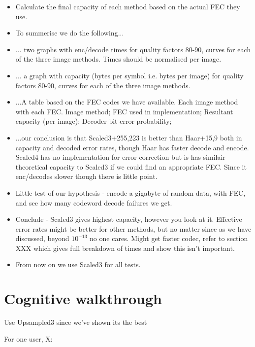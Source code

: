 \begin{itemize}
\item Calculate the final capacity of each method based on the actual FEC they use.

\item To summerise we do the following...

\item ... two graphs with enc/decode times for quality factors 80-90, curves for each of the three image methods. Times should be normalised per image.

\item ... a graph with capacity (bytes per symbol i.e. bytes per image) for quality factors 80-90, curves for each of the three image methods.

\item ...A table based on the FEC codes we have available. Each image method with each FEC. Image method; FEC used in implementation; Resultant capacity (per image); Decoder bit error probability; 

\item ...our conclusion is that Scaled3+255,223 is better than Haar+15,9 both in capacity and decoded error rates, though Haar has faster decode and encode. Scaled4 has no implementation for error correction but is has similair theoretical capacity to Scaled3 if we could find an appropriate FEC. Since it enc/decodes slower though there is little point.

\item Little test of our hypothesis - encode a gigabyte of random data, with FEC, and see how many codeword decode failures we get.

\item Conclude - Scaled3 gives highest capacity, however you look at it. Effective error rates might be better for other methods, but no matter since as we have discussed, beyond $10^{-13}$ no one cares. Might get faster codec, refer to section XXX which gives full breakdown of times and show this isn't important.

\item From now on we use Scaled3 for all tests.
\end{itemize} 


\section{Cognitive walkthrough}

Use Upsampled3 since we've shown its the best

For one user, X:

